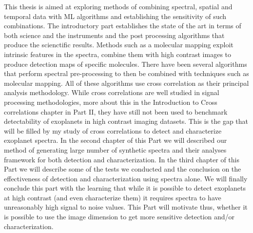 This thesis is aimed at exploring methods of combining spectral, spatial and temporal data with ML algorithms and establishing the sensitivity 
of such combinations. 
The introductory part establishes the state of the art in terms of both science and the instruments and the post processing algorithms that produce the scienctific results.
Methods such as a molecular mapping exploit intrinsic features in the spectra, combine them with high contrast images to produce detection maps of specific molecules.
There have been several algorithms \citep[e.g HRSDI][]{2019Haffert} that perform spectral pre-processing to then be combined with techniques such as molecular mapping.
All of these algorithms use cross correlation as their principal analysis methodology. 
While cross correlations are well studied in signal processing methodologies, more about this in the Introduction to Cross correlations chapter in Part II,
they have still not been used to benchmark detectability of exoplanets in high contrast imaging datasets.
This is the gap that will be filled by my study of cross correlations to detect and characterize exoplanet spectra.
In the second chapter of this Part we will described our method of generating large number of synthetic spectra and their analyses framework for both detection and characterization.
In the third chapter of this Part we will describe some of the tests we conducted and the conclusion on the effectiveness of detection and characterization using spectra alone.
We will finally conclude this part with the learning that while it is possible to detect exoplanets at high contrast (and even characterize them) it requires spectra to have unreasonably high signal to noise values.
This Part will motivate thus, whether it is possible to use the image dimension to get more sensitive detection and/or characterization.

